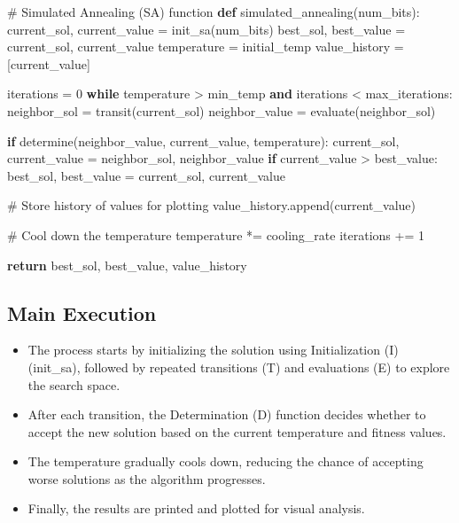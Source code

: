 \documentclass[
  letterpaper,
  DIV=11,
  numbers=noendperiod]{scrreprt}
\newenvironment{Shaded}{\begin{snugshade}}{\end{snugshade}}
\newcommand{\CommentTok}[1]{\textcolor[rgb]{0.37,0.37,0.37}{#1}}
\newcommand{\ControlFlowTok}[1]{\textcolor[rgb]{0.00,0.23,0.31}{\textbf{#1}}}
\newcommand{\DecValTok}[1]{\textcolor[rgb]{0.68,0.00,0.00}{#1}}
\newcommand{\KeywordTok}[1]{\textcolor[rgb]{0.00,0.23,0.31}{\textbf{#1}}}
\newcommand{\NormalTok}[1]{\textcolor[rgb]{0.00,0.23,0.31}{#1}}
\newcommand{\OperatorTok}[1]{\textcolor[rgb]{0.37,0.37,0.37}{#1}}
\providecommand{\tightlist}{%
  \setlength{\itemsep}{0pt}\setlength{\parskip}{0pt}}\usepackage{longtable,booktabs,array}
\begin{document}
\begin{Shaded}
\begin{Highlighting}[]
\CommentTok{\# Simulated Annealing (SA) function}
\KeywordTok{def}\NormalTok{ simulated\_annealing(num\_bits):}
\NormalTok{    current\_sol, current\_value }\OperatorTok{=}\NormalTok{ init\_sa(num\_bits)}
\NormalTok{    best\_sol, best\_value }\OperatorTok{=}\NormalTok{ current\_sol, current\_value}
\NormalTok{    temperature }\OperatorTok{=}\NormalTok{ initial\_temp}
\NormalTok{    value\_history }\OperatorTok{=}\NormalTok{ [current\_value]}

\NormalTok{    iterations }\OperatorTok{=} \DecValTok{0}
    \ControlFlowTok{while}\NormalTok{ temperature }\OperatorTok{\textgreater{}}\NormalTok{ min\_temp }\KeywordTok{and}\NormalTok{ iterations }\OperatorTok{\textless{}}\NormalTok{ max\_iterations:}
\NormalTok{        neighbor\_sol }\OperatorTok{=}\NormalTok{ transit(current\_sol)}
\NormalTok{        neighbor\_value }\OperatorTok{=}\NormalTok{ evaluate(neighbor\_sol)}

        \ControlFlowTok{if}\NormalTok{ determine(neighbor\_value, current\_value, temperature):}
\NormalTok{            current\_sol, current\_value }\OperatorTok{=}\NormalTok{ neighbor\_sol, neighbor\_value}
            \ControlFlowTok{if}\NormalTok{ current\_value }\OperatorTok{\textgreater{}}\NormalTok{ best\_value:}
\NormalTok{                best\_sol, best\_value }\OperatorTok{=}\NormalTok{ current\_sol, current\_value}

        \CommentTok{\# Store history of values for plotting}
\NormalTok{        value\_history.append(current\_value)}

        \CommentTok{\# Cool down the temperature}
\NormalTok{        temperature }\OperatorTok{*=}\NormalTok{ cooling\_rate}
\NormalTok{        iterations }\OperatorTok{+=} \DecValTok{1}

    \ControlFlowTok{return}\NormalTok{ best\_sol, best\_value, value\_history}
\end{Highlighting}
\end{Shaded}

\subsection{Main Execution}\label{main-execution-3}

\begin{itemize}
\tightlist
\item
  The process starts by initializing the solution using Initialization
  (I) (init\_sa), followed by repeated transitions (T) and evaluations
  (E) to explore the search space.
\item
  After each transition, the Determination (D) function decides whether
  to accept the new solution based on the current temperature and
  fitness values.
\item
  The temperature gradually cools down, reducing the chance of accepting
  worse solutions as the algorithm progresses.
\item
  Finally, the results are printed and plotted for visual analysis.
\end{itemize}
\end{document}
